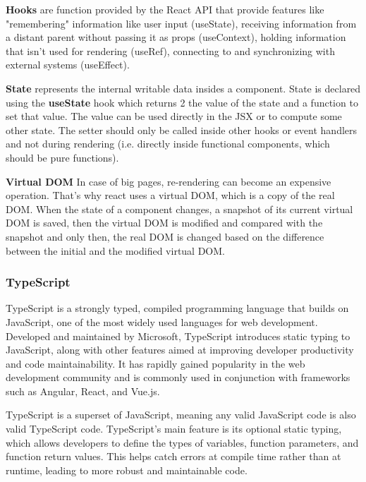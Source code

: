 \par \textbf{Hooks} are function provided by the React API that provide features like "remembering" information like user input (useState), receiving information from a distant parent without passing it as props (useContext), holding information that isn't used for rendering (useRef), connecting to and synchronizing with external systems (useEffect). \cite{reactHooks}

\par \textbf{State} represents the internal writable data insides a component. State is declared using the \textbf{useState} hook which returns 2 the value of the state and a function to set that value. The value can be used directly in the JSX or to compute some other state. The setter should only be called inside other hooks or event handlers and not during rendering (i.e. directly inside functional components, which should be pure functions).

\par \textbf{Virtual DOM} In case of big pages, re-rendering can become an expensive operation. That's why react uses a virtual DOM, which is a copy of the real DOM. When the state of a component changes, a snapshot of its current virtual DOM is saved, then the virtual DOM is modified and compared with the snapshot and only then, the real DOM is changed based on the difference between the initial and the modified virtual DOM.

\subsubsection{TypeScript}

\par TypeScript is a strongly typed, compiled programming language that builds on JavaScript, one of the most widely used languages for web development. Developed and maintained by Microsoft, TypeScript introduces static typing to JavaScript, along with other features aimed at improving developer productivity and code maintainability. It has rapidly gained popularity in the web development community and is commonly used in conjunction with frameworks such as Angular, React, and Vue.js.

\par TypeScript is a superset of JavaScript, meaning any valid JavaScript code is also valid TypeScript code. TypeScript’s main feature is its optional static typing, which allows developers to define the types of variables, function parameters, and function return values. This helps catch errors at compile time rather than at runtime, leading to more robust and maintainable code.

